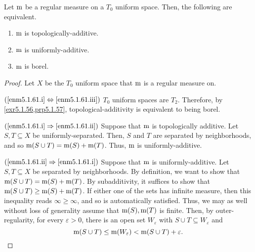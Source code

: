 \begin{prp}\label{prp5.1.61}
Let $\mathrm{m}$ be a regular measure on a $T_0$ uniform space.  Then, the following are equivalent.
\begin{enumerate}
\item \label{enm5.1.61.i}$\mathrm{m}$ is topologically-additive.
\item \label{enm5.1.61.ii}$\mathrm{m}$ is uniformly-additive.
\item \label{enm5.1.61.iii}$\mathrm{m}$ is borel.
\end{enumerate}
\begin{proof}
Let $X$ be the $T_0$ uniform space that $\mathrm{m}$ is a regular measure on.

\blankline
\noindent
$(\text{\ref{enm5.1.61.i}}\Leftrightarrow \text{\ref{enm5.1.61.iii}})$ $T_0$ uniform spaces are $T_2$.  Therefore, by \cref{exr5.1.56,prp5.1.57}, topological-additivity is equivalent to being borel.

\blankline
\noindent
$(\text{\ref{enm5.1.61.i}}\Rightarrow \text{\ref{enm5.1.61.ii}})$ Suppose that $\mathrm{m}$ is topologically additive.  Let $S,T\subseteq X$ be uniformly-separated.  Then, $S$ and $T$ are separated by neighborhoods, and so $\mathrm{m} (S\cup T)=\mathrm{m} (S)+\mathrm{m} (T)$.  Thus, $\mathrm{m}$ is uniformly-additive.

\blankline
\noindent
$(\text{\ref{enm5.1.61.ii}}\Rightarrow \text{\ref{enm5.1.61.i}})$ Suppose that $\mathrm{m}$ is uniformly-additive.  Let $S,T\subseteq X$  be separated by neighborhoods.  By definition, we want to show that $\mathrm{m} (S\cup T)=\mathrm{m} (S)+\mathrm{m} (T)$.  By subadditivity, it suffices to show that $\mathrm{m} (S\cup T)\geq \mathrm{m} (S)+\mathrm{m} (T)$.  If either one of the sets has infinite measure, then this inequality reads $\infty \geq \infty$, and so is automatically satisfied.  Thus, we may as well without loss of generality assume that $\mathrm{m} (S),\mathrm{m} (T)$ is finite.  Then, by outer-regularity, for every $\varepsilon >0$, there is an open set $W_{\varepsilon}$ with $S\cup T\subseteq W_{\varepsilon}$ and
\begin{equation}
\mathrm{m} (S\cup T)\leq \mathrm{m} (W_{\varepsilon})<\mathrm{m} (S\cup T)+\varepsilon .
\end{equation}


\end{proof}
\end{prp}

